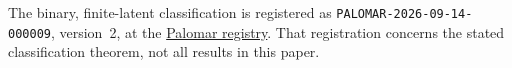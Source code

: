 The binary, finite-latent classification is registered as \texttt{PALOMAR-2026-09-14-000009}, version~2, at the \href{https://palomar-registry.org/entry.html?id=PALOMAR-2026-09-14-000009&version=2}{Palomar registry}. That registration concerns the stated classification theorem, not all results in this paper.
